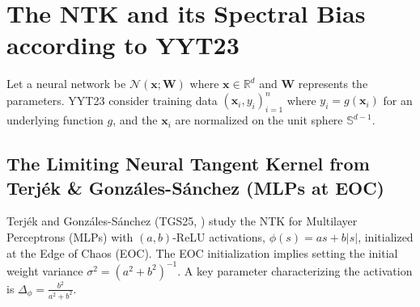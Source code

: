 \documentclass{article}
\begin{document}
\section{The NTK and its Spectral Bias according to YYT23}

Let a neural network be $\mathcal{N}(\mathbf{x}; \mathbf{W})$ where $\mathbf{x} \in \mathbb{R}^d$ and $\mathbf{W}$ represents the parameters. YYT23 consider training data $(\mathbf{x}_i, y_i)_{i=1}^n$ where $y_i = g(\mathbf{x}_i)$ for an underlying function $g$, and the $\mathbf{x}_i$ are normalized on the unit sphere $\mathbb{S}^{d-1}$.

\subsection{The Limiting Neural Tangent Kernel from Terjék \& Gonzáles-Sánchez (MLPs at EOC)}
Terjék and Gonzáles-Sánchez (TGS25, \citep{terjek2025ntk}) study the NTK for Multilayer Perceptrons (MLPs) with $(a,b)$-ReLU activations, $\phi(s) = as + b|s|$, initialized at the Edge of Chaos (EOC). The EOC initialization implies setting the initial weight variance $\sigma^2 = (a^2+b^2)^{-1}$. A key parameter characterizing the activation is $\Delta_\phi = \frac{b^2}{a^2+b^2}$.
\end{document}
